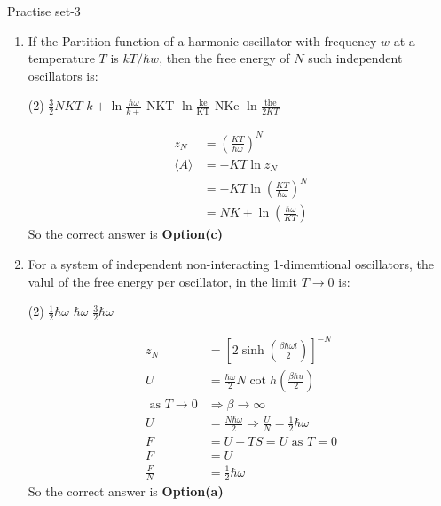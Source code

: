 \newpage
\begin{abox}
	Practise set-3
\end{abox}
\begin{enumerate}
	\item If the Partition function of a harmonic oscillator with frequency $w$ at a temperature $T$ is $k T/ \hbar w$, then the free energy of $N$ such independent oscillators is:
		\begin{tasks}(2)
			\task[\textbf{a.}]$\frac{3}{2} N K T$
			\task[\textbf{b.}]$k+\ln \frac{\hbar \omega}{k+}$
			\task[\textbf{c.}]NKT $\ln \frac{\mathrm{ke}}{\mathrm{KT}}$
			\task[\textbf{d.}] NKe $\ln \frac{\text { the }}{2 K T}$
		\end{tasks}
	\begin{answer}
		\begin{align*}
		z_{N} &=\left(\frac{K T}{\hbar \omega}\right)^{N} \\
		\langle A\rangle &=-K T \ln z_{N} \\
		&=-K T \ln \left(\frac{K T}{\hbar \omega}\right)^{N} \\
		&=N K+\ln \left(\frac{\hbar \omega}{K T}\right)
		\end{align*}
		So the correct answer is \textbf{Option(c)}
	\end{answer}
\item For a system of independent non-interacting 1-dimemtional oscillators, the valul of the free energy per oscillator, in the limit $T \rightarrow 0$ is:
	\begin{tasks}(2)
		\task[\textbf{a.}] $\frac{1}{2} \hbar \omega$
		\task[\textbf{b.}]$\hbar\omega$
		\task[\textbf{c.}]$\frac{3}{2} \hbar \omega$
		\task[\textbf{d.}] 0
	\end{tasks}
\begin{answer}
	\begin{align*}
	z_{N}&=\left[2 \sinh \left(\frac{\beta \hbar \omega l}{2}\right)\right]^{-N}\\
	U&=\frac{\hbar \omega}{2} N \cot h\left(\frac{\beta \hbar u}{2}\right)\\
	\text { as } T \rightarrow 0 &\Rightarrow \beta \rightarrow \infty\\
	U&=\frac{N \hbar \omega}{2} \Rightarrow \frac{U}{N}=\frac{1}{2} \hbar \omega\\
	F&=U-T S=U \text { as } T=0\\
	F&=U\\
	\frac{F}{N}&=\frac{1}{2} \hbar \omega
	\end{align*}
	So the correct answer is \textbf{Option(a)}

\end{answer}
\end{enumerate}

